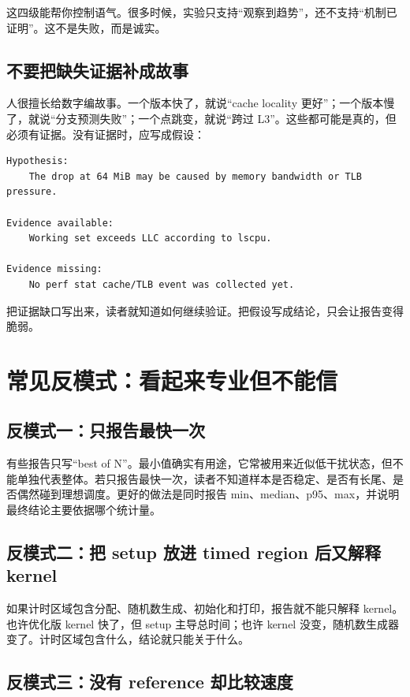 这四级能帮你控制语气。很多时候，实验只支持“观察到趋势”，还不支持“机制已证明”。这不是失败，而是诚实。

\subsection{不要把缺失证据补成故事}

人很擅长给数字编故事。一个版本快了，就说“cache locality 更好”；一个版本慢了，就说“分支预测失败”；一个点跳变，就说“跨过 L3”。这些都可能是真的，但必须有证据。没有证据时，应写成假设：

\begin{lstlisting}
Hypothesis:
    The drop at 64 MiB may be caused by memory bandwidth or TLB pressure.

Evidence available:
    Working set exceeds LLC according to lscpu.

Evidence missing:
    No perf stat cache/TLB event was collected yet.
\end{lstlisting}

把证据缺口写出来，读者就知道如何继续验证。把假设写成结论，只会让报告变得脆弱。

\section{常见反模式：看起来专业但不能信}

\subsection{反模式一：只报告最快一次}

有些报告只写“best of N”。最小值确实有用途，它常被用来近似低干扰状态，但不能单独代表整体。若只报告最快一次，读者不知道样本是否稳定、是否有长尾、是否偶然碰到理想调度。更好的做法是同时报告 min、median、p95、max，并说明最终结论主要依据哪个统计量。

\subsection{反模式二：把 setup 放进 timed region 后又解释 kernel}

如果计时区域包含分配、随机数生成、初始化和打印，报告就不能只解释 kernel。也许优化版 kernel 快了，但 setup 主导总时间；也许 kernel 没变，随机数生成器变了。计时区域包含什么，结论就只能关于什么。

\subsection{反模式三：没有 reference 却比较速度}

